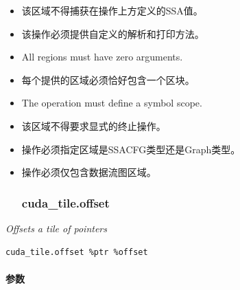 \documentclass{article}
\begin{document}
\begin{itemize}
\item 该区域不得捕获在操作上方定义的SSA值。
\item 该操作必须提供自定义的解析和打印方法。
\item All regions must have zero arguments.
\item 每个提供的区域必须恰好包含一个区块。
\item The operation must define a symbol scope.
\item 该区域不得要求显式的终止操作。
\item 操作必须指定区域是SSACFG类型还是Graph类型。
\item 操作必须仅包含数据流图区域。


\subsubsection{cuda\_tile.offset}

\end{itemize}
\textit{Offsets a tile of pointers}


\begin{lstlisting}
cuda_tile.offset %ptr %offset
\end{lstlisting}

\paragraph{参数}
\end{document}
